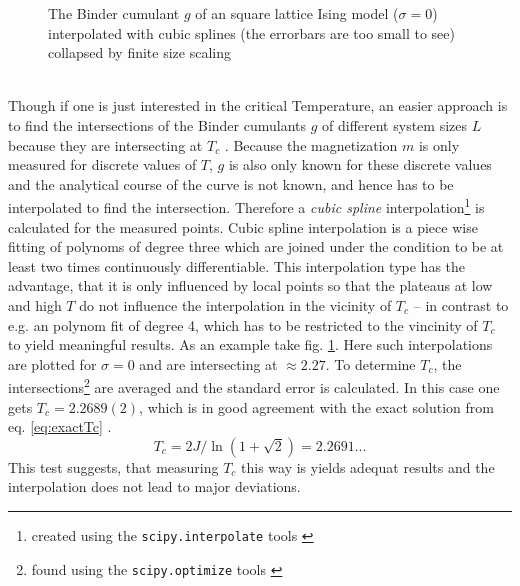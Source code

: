     \begin{figure}[htbp]
        \centering
        \caption[Examples of determining critical temperature and exponents]
        {
            The Binder cumulant \(g\) of an square lattice Ising model
            (\(\sigma=0\))\\
             interpolated
                with cubic splines (the errorbars are too small to see)\\
             collapsed by finite
                size scaling
        }
        \label{fig:gettingCrit}
    \end{figure}\\
    Though if one is just interested in the critical Temperature, an
    easier approach is to find the intersections of the Binder cumulants
    \(g\) of different system sizes \(L\) because they are intersecting
    at \(T_c\) \cite{Binder1981}.
    Because the magnetization \(m\) is only measured for discrete values
    of \(T\), \(g\) is also only known for these discrete values and the
    analytical course of the curve is not known, and hence has
    to be interpolated to find the intersection. Therefore a \emph{cubic spline}
    interpolation\footnote{created using the \texttt{scipy.interpolate} tools \cite{scipy2001}}
    is calculated for the measured points.
    Cubic spline interpolation is a piece wise fitting of polynoms of
    degree three which are joined under the condition to be at least two
    times continuously differentiable. This interpolation type has the
    advantage, that it is only influenced by local points so that the
    plateaus at low and high \(T\) do not influence the interpolation in
    the vicinity of \(T_c\) -- in contrast to e.g. an polynom fit of
    degree 4, which has to be restricted to the vincinity of \(T_c\) to
    yield meaningful results.
    As an example take fig. \ref{fig:gettingCrit}.
    Here such interpolations are plotted for \(\sigma=0\) and are
    intersecting at \(\approx 2.27\).
    To determine \(T_c\), the intersections\footnote{found using the \texttt{scipy.optimize} tools \cite{scipy2001}}
    are averaged and the standard error is calculated. In this case one
    gets \(T_c = 2.2689(2)\), which is in good agreement with the
    exact solution from eq. \eqref{eq:exactTc} \cite{Onsager1944}.
    \begin{equation}
        T_c = 2J/\ln(1+\sqrt 2) = 2.2691...
        \label{eq:exactTc}
    \end{equation}
    This test suggests, that measuring \(T_c\) this way is yields
    adequat results and the interpolation does not lead to major
    deviations.

